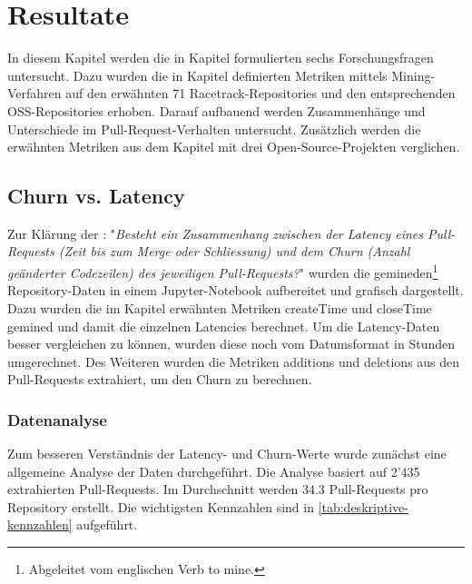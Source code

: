 


\chapter{Resultate} %

\label{Chapter4} %

In diesem Kapitel werden die in Kapitel  formulierten sechs Forschungsfragen untersucht. Dazu wurden die in Kapitel  definierten Metriken mittels Mining-Verfahr\-en auf den erwähnten 71 Racetrack-Repositories und den entsprechenden OSS-Repo\-sitories erhoben. Darauf aufbauend werden Zusammenhänge und Unterschiede im Pull-Request-Verhalten untersucht. Zusätzlich werden die erwähnten Metriken aus dem Kapitel  mit drei Open-Source-Projekten verglichen. 


\section{Churn vs. Latency}
\label{sec:ResultatChurnLatency}
Zur Klärung der : "\textit{Besteht ein Zusammenhang zwischen der Latency eines Pull-Requests (Zeit bis zum Merge oder Schliessung) und dem Churn (Anzahl geänderter Codezeilen) des jeweiligen Pull-Requests?}" wurden die gemineden\footnote{Abgeleitet vom englischen Verb to mine.} Repository-Daten in einem Jupyter-Notebook aufbereitet und grafisch dargestellt. Dazu wurden die im Kapitel  erwähnten Metriken createTime und closeTime gemined und damit die einzelnen Latencies berechnet. Um die Latency-Daten besser vergleichen zu können, wurden diese noch vom Datumsformat in Stunden umgerechnet. Des Weiteren wurden die Metriken  additions und deletions aus den Pull-Requests extrahiert, um den Churn zu berechnen.

\subsection{Datenanalyse}
Zum besseren Verständnis der Latency- und Churn-Werte wurde zunächst eine allgemeine Analyse der Daten durchgeführt.
Die Analyse basiert auf 2'435 extrahierten Pull-Requests. Im Durchschnitt werden 34.3 Pull-Requests pro Repository erstellt. Die wichtigsten Kennzahlen sind in \autoref{tab:deskriptive-kennzahlen} aufgeführt.


